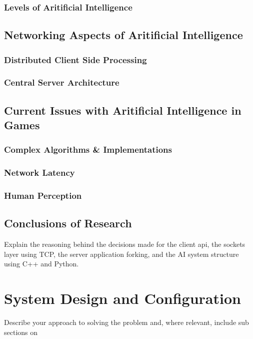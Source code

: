 \documentclass[12pt,a4paper,titlepage]{article}
\begin{document}
\subsubsection{Levels of Aritificial Intelligence}

\subsection{Networking Aspects of Aritificial Intelligence}

\subsubsection{Distributed Client Side Processing}

\subsubsection{Central Server Architecture}

\subsection{Current Issues with Aritificial Intelligence in Games}

\subsubsection{Complex Algorithms \& Implementations}

\subsubsection{Network Latency}

\subsubsection{Human Perception}

\subsection{Conclusions of Research}

Explain the reasoning behind the decisions made for the client api, the sockets layer using TCP, the server application forking, and the AI system structure using C++ and Python.

\section{System Design and Configuration}
Describe your approach to solving the problem and, where relevant, include sub sections on
\end{document}
